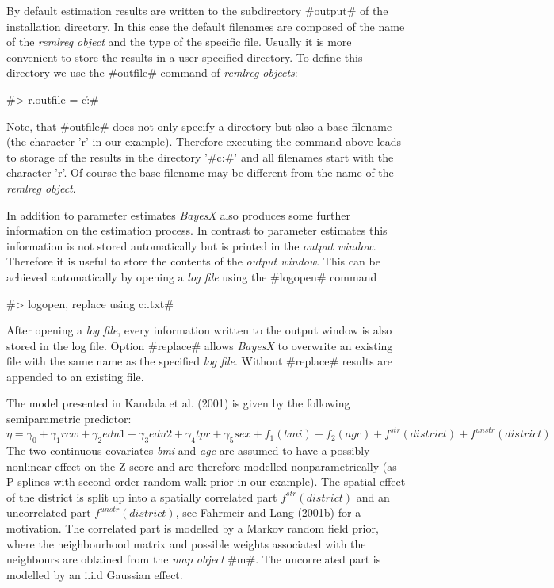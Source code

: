 \documentclass{article}
\begin{document}
By default estimation results are written to the subdirectory
#output# of the installation directory. In this case the default
filenames are composed of the name of the {\it remlreg object} and
the type of the specific file. Usually it is more convenient to
store the results in a user-specified directory. To define this
directory we use the #outfile# command of {\it remlreg objects}:

#> r.outfile = c:\data\r#

Note, that #outfile# does not only specify a directory but also a
base filename (the character 'r' in our example). Therefore
executing the command above leads to storage of the results in the
directory '#c:\data#' and all filenames start with the character
'r'. Of course the base filename may be different from the name of
the {\it remlreg object}.

In addition to parameter estimates {\it BayesX} also produces some
further information on the estimation process. In contrast to
parameter estimates this information is not stored automatically
but is printed in the {\it output window}. Therefore it is useful
to store the contents of the {\it output window}. This can be
achieved automatically by opening a {\it log file} using the
#logopen# command

#> logopen, replace using c:\data\logreml.txt#

After opening a {\it log file}, every information written to the
output window is also stored in the log file. Option #replace#
allows {\it BayesX} to overwrite an existing file with the same
name as the specified {\it log file}. Without #replace# results
are appended to an existing file.

The model presented in Kandala et al. (2001) is given by the
following semiparametric predictor:
\[\eta=\gamma_0+\gamma_1rcw+\gamma_2edu1+\gamma_3edu2+\gamma_4tpr+\gamma_5sex+f_1(bmi)+f_2(agc)+f^{str}(district)+f^{unstr}(district)\]
The two continuous covariates {\em bmi} and {\em agc} are assumed
to have a possibly nonlinear effect on the Z-score and are
therefore modelled nonparametrically (as P-splines with second
order random walk prior in our example). The spatial effect of the
district is split up into a spatially correlated part $
f^{str}(district)$ and an uncorrelated part $f^{unstr}(district)$,
see Fahrmeir and Lang (2001b) \nocite{fahlan01b} for a motivation.
The correlated part is modelled by a Markov random field prior,
where the neighbourhood matrix and possible weights associated
with the neighbours are obtained from the {\it map object} #m#.
The uncorrelated part is modelled by an  i.i.d Gaussian effect.
\end{document}
